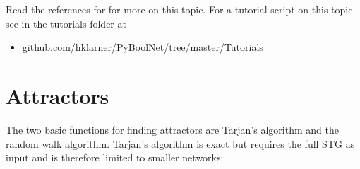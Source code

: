 \documentclass[letterpaper,10pt,english]{sphinxmanual}
\begin{document}
\begin{sphinxVerbatim}[commandchars=\\\{\}]
  
      
 
       
            
\end{sphinxVerbatim}

Read the references for {\hyperref[\detokenize{StateTransitionGraphs:statetransitiongraphs}]{}} for more on this topic.
For a tutorial script on this topic see  in the tutorials folder at
\begin{itemize}
\item {} 
github.com/hklarner/PyBoolNet/tree/master/Tutorials

\end{itemize}


\section{Attractors}
\label{\detokenize{ManualQuick:attractors}}
The two basic functions for finding attractors are Tarjan’s algorithm and the random walk algorithm.
Tarjan’s algorithm is exact but requires the full STG as input and is therefore limited to smaller networks:
\end{document}
